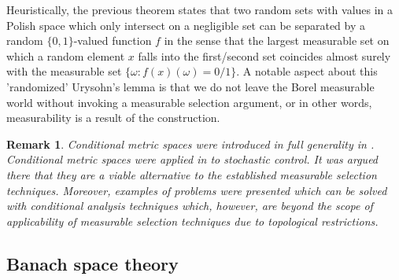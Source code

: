 \documentclass{jloganal}
\numberwithin{equation}{section}
\theoremstyle{plain}
\newtheorem{remark}[subsection]{Remark}
\begin{document}
Heuristically, the previous theorem states that two random sets with values in a Polish space which only intersect on a negligible set can be separated by a random $\{0,1\}$-valued function $f$ in the sense that the largest measurable set on which a random element $x$ falls into the first/second set coincides almost surely with the measurable set $\{\omega\colon f(x)(\omega)=0/1\}$. 
A notable aspect about this 'randomized' Urysohn's lemma is that we do not leave the Borel measurable world without invoking a measurable selection argument, or in other words, measurability is a result of the construction. 
\begin{remark}
Conditional metric spaces were introduced in full generality in \cite{drapeau2016algebra}. 
Conditional metric spaces were applied in \cite{jamneshan2017parameter} to stochastic control. 
It was argued there that they are a viable alternative to the established measurable selection techniques. 
Moreover, examples of problems were presented which can be solved with conditional analysis techniques which, however, are beyond the scope of applicability of measurable selection techniques due to topological restrictions.  
\end{remark} 

\subsection{Banach space theory}\label{sec:banach}
\end{document}
